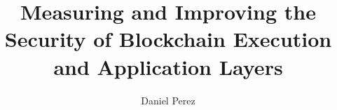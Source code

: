 \documentclass[a4paper,12pt,twoside]{report}
\begin{document}
\title{\LARGE {\bf Measuring and Improving the Security of Blockchain Execution and Application Layers}\\
 \vspace*{6mm}
}

\author{Daniel Perez}

\normallinespacing
\maketitle

\preface





\body









\appendix




\end{document}
